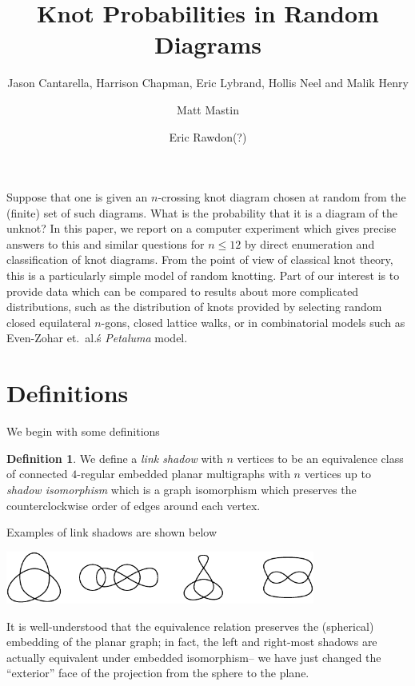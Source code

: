 \documentclass[amsmath,secnumarabic,floatfix,amssymb,nofootinbib,nobibnotes,letterpaper,11pt,tightenlines,showkeys]{revtex4}
\theoremstyle{definition}
\newtheorem{definition}[theorem]{Definition}
\begin{document}
\title[]{Knot Probabilities in Random Diagrams}
\author{Jason Cantarella, Harrison Chapman, Eric Lybrand, Hollis Neel and Malik Henry}
\noaffiliation
\author{Matt Mastin}
\noaffiliation
\author{Eric Rawdon(?)}
\noaffiliation

\maketitle

Suppose that one is given an $n$-crossing knot diagram chosen at random from the (finite) set of such diagrams. What is the probability that it is a diagram of the unknot? In this paper, we report on a computer experiment which gives precise answers to this and similar questions for $n \leq 12$ by direct enumeration and classification of knot diagrams. From the point of view of classical knot theory, this is a particularly simple model of random knotting. Part of our interest is to provide data which can be compared to results about more complicated distributions, such as the distribution of knots provided by selecting random closed equilateral $n$-gons, closed lattice walks, or in combinatorial models such as Even-Zohar et.\ al.\'s \emph{Petaluma} model.

\section{Definitions}

We begin with some definitions
\begin{definition}
We define a \emph{link shadow} with $n$ vertices to be an equivalence class of connected $4$-regular embedded planar multigraphs with $n$ vertices up to \emph{shadow isomorphism} which is a graph isomorphism which preserves the counterclockwise order of edges around each vertex.
\end{definition}

Examples of link shadows are shown below
\begin{center}
\includegraphics[width=4in]{linkshadow}
\end{center}
It is well-understood that the equivalence relation preserves the (spherical) embedding of the planar graph; in fact, the left and right-most shadows are actually equivalent under embedded isomorphism-- we have just changed the ``exterior'' face of the projection from the sphere to the plane. 
\end{document}
